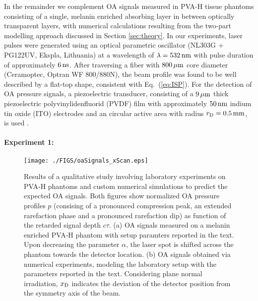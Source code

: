 \documentclass[12pt]{iopart}
\begin{document}
In the remainder we complement OA signals measured in PVA-H tissue phantoms
consisting of a single, melanin enriched absorbing layer in between optically
transparent layers, with numerical calculations resulting from the two-part
modelling approach discussed in Section \ref{sec:theory}.  In our experiments,
laser pulses were generated using an optical parametric oscillator (NL303G +
PG122UV, Ekspla, Lithuania) at a wavelength of $\lambda=532\,{\rm{nm}}$ with
pulse duration of approximately $6\,{\rm{ns}}$. After traversing a fiber with
$800\,{\rm{\mu m}}$ core diameter (Ceramoptec, Optran WF 800/880N), the beam
profile was found to be well described by a flat-top shape, consistent with
Eq.\ (\ref{eq:ISP}).  For the detection of OA pressure signals, a piezoelectric
transducer, consisting of a $9\,{\rm{\mu m}}$ thick piezoelectric
polyvinylidenfluorid (PVDF) film with approximately $50\,{\rm{nm}}$ indium tin
oxide (ITO) electrodes and an circular active area with radius $r_{\rm
D}=0.5\,{\rm{mm}}$, is used \cite{Niederhauser:2005}.

\paragraph{Experiment 1:}

\begin{figure}[t!]
\centerline{\texttt{[image: ./FIGS/oaSignals\_xScan.eps]}} 
\caption{Results of a qualitative study involving laboratory experiments on
PVA-H phantoms and custom numerical simulations to predict the expected OA
signals.  Both figures show normalized OA pressure profiles $p$ (consising of a
pronounced compression peak, an extended rarefaction phase and a pronounced
rarefaction dip) as function of the retarded signal depth $c \tau$.  (a) OA
signals measured on a melanin enriched PVA-H phantom with setup paramters
reported in the text. Upon decreasing the parameter $\alpha$, the laser spot is
shifted across the phantom towards the detector location.  (b) OA signals
obtained via numerical experiments, modeling the laboratory setup with the
parameters reported in the text. Considering plane normal irradiation, $x_{\rm
D}$ indicates the deviation of the detector position from the symmetry axis of
the beam. }
\label{fig:ex1}
\end{figure}
\end{document}
